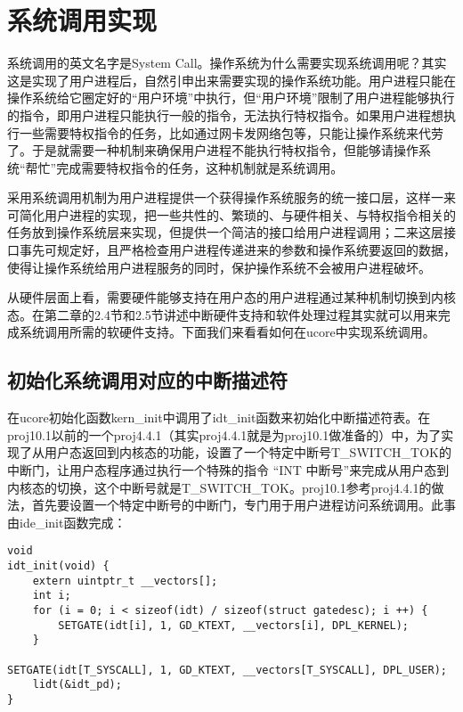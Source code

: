 \section{系统调用实现}\label{ux7cfbux7edfux8c03ux7528ux5b9eux73b0}

系统调用的英文名字是System
Call。操作系统为什么需要实现系统调用呢？其实这是实现了用户进程后，自然引申出来需要实现的操作系统功能。用户进程只能在操作系统给它圈定好的``用户环境''中执行，但``用户环境''限制了用户进程能够执行的指令，即用户进程只能执行一般的指令，无法执行特权指令。如果用户进程想执行一些需要特权指令的任务，比如通过网卡发网络包等，只能让操作系统来代劳了。于是就需要一种机制来确保用户进程不能执行特权指令，但能够请操作系统``帮忙''完成需要特权指令的任务，这种机制就是系统调用。

采用系统调用机制为用户进程提供一个获得操作系统服务的统一接口层，这样一来可简化用户进程的实现，把一些共性的、繁琐的、与硬件相关、与特权指令相关的任务放到操作系统层来实现，但提供一个简洁的接口给用户进程调用；二来这层接口事先可规定好，且严格检查用户进程传递进来的参数和操作系统要返回的数据，使得让操作系统给用户进程服务的同时，保护操作系统不会被用户进程破坏。

从硬件层面上看，需要硬件能够支持在用户态的用户进程通过某种机制切换到内核态。在第二章的2.4节和2.5节讲述中断硬件支持和软件处理过程其实就可以用来完成系统调用所需的软硬件支持。下面我们来看看如何在ucore中实现系统调用。

\subsection{初始化系统调用对应的中断描述符}\label{ux521dux59cbux5316ux7cfbux7edfux8c03ux7528ux5bf9ux5e94ux7684ux4e2dux65adux63cfux8ff0ux7b26}

在ucore初始化函数kern\_init中调用了idt\_init函数来初始化中断描述符表。在proj10.1以前的一个proj4.4.1（其实proj4.4.1就是为proj10.1做准备的）中，为了实现了从用户态返回到内核态的功能，设置了一个特定中断号T\_SWITCH\_TOK的中断门，让用户态程序通过执行一个特殊的指令
``INT
中断号''来完成从用户态到内核态的切换，这个中断号就是T\_SWITCH\_TOK。proj10.1参考proj4.4.1的做法，首先要设置一个特定中断号的中断门，专门用于用户进程访问系统调用。此事由ide\_init函数完成：

\begin{lstlisting}
void
idt_init(void) {
    extern uintptr_t __vectors[];
    int i;
    for (i = 0; i < sizeof(idt) / sizeof(struct gatedesc); i ++) {
        SETGATE(idt[i], 1, GD_KTEXT, __vectors[i], DPL_KERNEL);
    }
    SETGATE(idt[T_SYSCALL], 1, GD_KTEXT, __vectors[T_SYSCALL], DPL_USER);
    lidt(&idt_pd);
}
\end{lstlisting}

